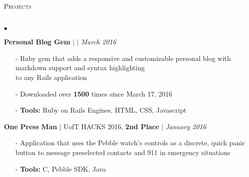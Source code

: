 \documentclass[11pt]{article}
\newcommand{\lineunder}{\vspace*{-8pt} \\ \hspace*{-18pt} \hrulefill \\}
\newcommand{\header}[1]{{\hspace*{-15pt}\vspace*{6pt} \textsc{#1}} \vspace*{-6pt} \lineunder }
\newenvironment{achievements}{\begin{list}{$\bullet$}{\topsep 0pt \itemsep -1.5pt \leftmargin 5pt}}{\vspace*{4pt}\end{list}}
\begin{document}
\header{\fontsize{11.4}{10}\selectfont Projects}
\begin{achievements}
\def\UrlFont{\em}
\item \textbf{Personal Blog Gem}  $|$  \href{https://github.com/nakulpathak3/personal-blog-gem}{\faGithub}  $|$ \href{https://rubygems.org/gems/personal_blog}{\faExternalLink} \hfill \textit {March 2016}
\begin{itemize}
\item[-]Ruby gem that adds a responsive and customizable personal blog with markdown support and syntax highlighting \\ to any Rails application
\vspace{3pt}
\item[-]Downloaded over \textbf{1500} times since March 17, 2016
\vspace{3pt}
\item[-]\textbf{Tools:} Ruby on Rails Engines, HTML, CSS, Javascript
\end{itemize}

\vspace{6pt}

\item \textbf{One Press Man} {$|$ \scriptsize UofT HACKS 2016, \textbf{2nd Place}} $|$  \href{https://github.com/adrianmachado/Onepressman}{\faGithub} \hfill \textit {January 2016}
\begin{itemize}
\item[-]Application that uses the Pebble watch's controls as a discrete, quick panic button to message preselected contacts and 911 in emergency situations
\vspace{3pt}
\item[-]\textbf{Tools:} C, Pebble SDK, Java
\end{itemize}




\end{achievements}
\end{document}
